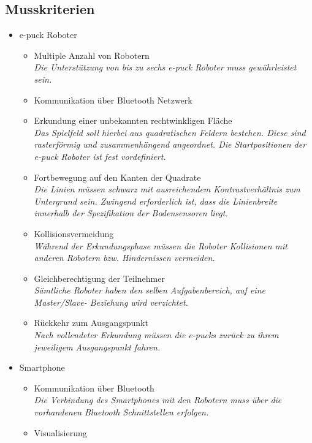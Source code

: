 \documentclass[10pt,a4paper]{article}
\begin{document}
		\subsection{Musskriterien}
			\begin{itemize}
				\item e-puck Roboter
				\begin{itemize}
					\item Multiple Anzahl von Robotern
						\\ \textsl{Die Unterstützung von bis zu sechs e-puck Roboter muss gewährleistet sein.}
					\item Kommunikation über Bluetooth Netzwerk
					\item Erkundung einer unbekannten rechtwinkligen Fläche
						\\ \textsl{Das Spielfeld soll hierbei aus quadratischen Feldern bestehen. Diese sind rasterförmig
						 	und zusammenhängend angeordnet. Die Startpositionen der e-puck Roboter ist fest
						 	vordefiniert.}
					\item Fortbewegung auf den Kanten der Quadrate
						\\ \textsl{Die Linien müssen schwarz mit ausreichendem Kontrastverhältnis zum Untergrund
							sein.	Zwingend erforderlich ist, dass die Linienbreite innerhalb der Spezifikation der
							Bodensensoren	liegt.}		
					\item Kollisionsvermeidung
						\\ \textsl{Während der Erkundungsphase müssen die Roboter Kollisionen mit anderen Robotern
							bzw. Hindernissen vermeiden.}	
					\item Gleichberechtigung der Teilnehmer
						\\ \textsl{Sämtliche Roboter haben den selben Aufgabenbereich, auf eine Master/Slave-
							Beziehung wird verzichtet.}	
					\item Rückkehr zum Ausgangspunkt
						\\ \textsl{Nach vollendeter Erkundung müssen die e-pucks zurück zu ihrem jeweiligem
							Ausgangspunkt fahren.}	
				\end{itemize}
				\item Smartphone
				\begin{itemize}
					\item Kommunikation über Bluetooth
						\\ \textsl{Die Verbindung des Smartphones mit den Robotern muss über die vorhandenen
							Bluetooth Schnittstellen erfolgen.}
					\item Visualisierung

\end{itemize}
\end{itemize}
\end{document}
